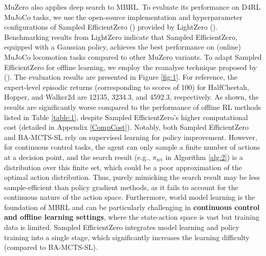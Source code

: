 MuZero also applies deep search to MBRL. To evaluate its performance on D4RL MuJoCo tasks, we use the open-source implementation and hyperparameter configurations of Sampled EfficientZero (\cite{DBLP:conf/nips/YeLKAG21}) provided by LightZero (\cite{DBLP:conf/nips/NiuPYLZRHLL23}). Benchmarking results from LightZero indicate that Sampled EfficientZero, equipped with a Gaussian policy, achieves the best performance on (online) MuJoCo locomotion tasks compared to other MuZero variants. To adapt Sampled EfficientZero for offline learning, we employ the reanalyse technique proposed by (\cite{DBLP:conf/nips/SchrittwieserHM21}). The evaluation results are presented in Figure \ref{fig:1}. For reference, the expert-level episodic returns (corresponding to scores of 100) for HalfCheetah, Hopper, and Walker2d are 12135, 3234.3, and 4592.3, respectively. As shown, the results are significantly worse compared to the performance of offline RL methods listed in Table \ref{table:1}, despite Sampled EfficientZero's higher computational cost (detailed in Appendix \ref{CompCost}). Notably, both Sampled EfficientZero and BA-MCTS-SL rely on supervised learning for policy improvement. However, for continuous control tasks, the agent can only sample a finite number of actions at a decision point, and the search result (e.g., $\pi_{\text{ret}}$ in Algorithm \ref{alg:2}) is a distribution over this finite set, which could be a poor approximation of the optimal action distribution. Thus, purely mimicking the search result may be less sample-efficient than policy gradient methods, as it fails to account for the continuous nature of the action space. Furthermore, world model learning is the foundation of MBRL and can be particularly challenging in \textbf{continuous control and offline learning settings}, where the state-action space is vast but training data is limited. Sampled EfficientZero integrates model learning and policy training into a single stage, which significantly increases the learning difficulty (compared to BA-MCTS-SL).


